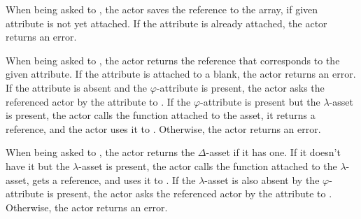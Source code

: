 When being asked to , the actor saves the reference to the array, if given attribute is not yet attached.
If the attribute is already attached, the actor returns an error.

When being asked to , the actor returns the reference that corresponds to the given attribute.
If the attribute is attached to a blank, the actor returns an error.
If the attribute is absent and the \(\varphi\)-attribute is present, the actor asks the referenced actor by the attribute to .
If the \(\varphi\)-attribute is present but the \(\lambda\)-asset is present, the actor calls the function attached to the asset, it returns a reference, and the actor uses it to .
Otherwise, the actor returns an error.

When being asked to , the actor returns the \(\Delta\)-asset if it has one.
If it doesn't have it but the \(\lambda\)-asset is present, the actor calls the function attached to the \(\lambda\)-asset, gets a reference, and uses it to .
If the \(\lambda\)-asset is also absent by the \(\varphi\)-attribute is present, the actor asks the referenced actor by the attribute to .
Otherwise, the actor returns an error.
